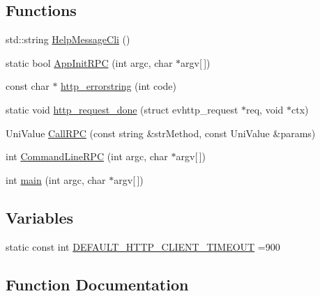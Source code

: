 \subsection*{Functions}
\begin{DoxyCompactItemize}
\item 
std\+::string \mbox{\hyperlink{bitcoin-cli_8cpp_a1132a90be0b486a0c670ea50e2bf4c17}{Help\+Message\+Cli}} ()
\item 
static bool \mbox{\hyperlink{bitcoin-cli_8cpp_aa690e04a0e4a86d9bc2794626221c2d8}{App\+Init\+R\+PC}} (int argc, char $\ast$argv\mbox{[}$\,$\mbox{]})
\item 
const char $\ast$ \mbox{\hyperlink{bitcoin-cli_8cpp_ab3acf46fef3bcfa7dbc9250395c0f145}{http\+\_\+errorstring}} (int code)
\item 
static void \mbox{\hyperlink{bitcoin-cli_8cpp_a3da81a3ec830a6948112e5454eec1b3d}{http\+\_\+request\+\_\+done}} (struct evhttp\+\_\+request $\ast$req, void $\ast$ctx)
\item 
Uni\+Value \mbox{\hyperlink{bitcoin-cli_8cpp_accc586ded09d9de834628afd6364a6c2}{Call\+R\+PC}} (const string \&str\+Method, const Uni\+Value \&params)
\item 
int \mbox{\hyperlink{bitcoin-cli_8cpp_a4ee23259648a971c9c05aeff8b545a6d}{Command\+Line\+R\+PC}} (int argc, char $\ast$argv\mbox{[}$\,$\mbox{]})
\item 
int \mbox{\hyperlink{bitcoin-cli_8cpp_a0ddf1224851353fc92bfbff6f499fa97}{main}} (int argc, char $\ast$argv\mbox{[}$\,$\mbox{]})
\end{DoxyCompactItemize}
\subsection*{Variables}
\begin{DoxyCompactItemize}
\item 
static const int \mbox{\hyperlink{bitcoin-cli_8cpp_a2d5642f154091962217626d344213d45}{D\+E\+F\+A\+U\+L\+T\+\_\+\+H\+T\+T\+P\+\_\+\+C\+L\+I\+E\+N\+T\+\_\+\+T\+I\+M\+E\+O\+UT}} =900
\end{DoxyCompactItemize}


\subsection{Function Documentation}
\mbox{\label{bitcoin-cli_8cpp_aa690e04a0e4a86d9bc2794626221c2d8}} 
